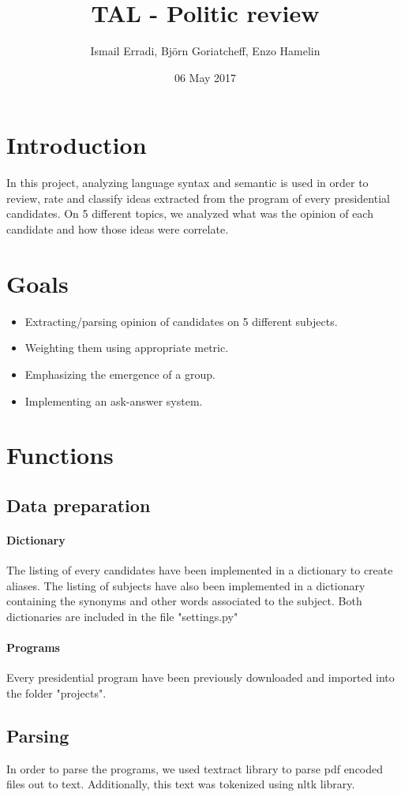 \documentclass{article}
\title{TAL - Politic review}
\author{ Ismail Erradi, Björn Goriatcheff, Enzo Hamelin  }
\date{06 May 2017}
\begin{document}
\maketitle

\section{Introduction}
    In this project, analyzing language syntax and semantic is used in order to review, rate and classify ideas extracted from the program of every presidential candidates. On 5 different topics, we analyzed what was the opinion of each candidate and how those ideas were correlate.
    
\section{Goals}
\begin {itemize}
\item Extracting/parsing opinion of candidates on 5 different subjects.
\item Weighting them using appropriate metric.
\item Emphasizing the emergence of a group.
\item Implementing an ask-answer system.
\end{itemize}


\section{Functions}
\subsection{Data preparation}
\paragraph{Dictionary}
The listing of every candidates have been implemented in a dictionary to create aliases.
The listing of subjects have also been implemented in a dictionary containing the synonyms and other words associated to the subject.
Both dictionaries are included in the file "settings.py"
\paragraph{Programs}
Every presidential program have been previously downloaded and imported into the folder "projects".

\subsection{Parsing}
In order to parse the programs, we used textract library to parse pdf encoded files out to text.
Additionally, this text was tokenized using nltk library.
\end{document}
